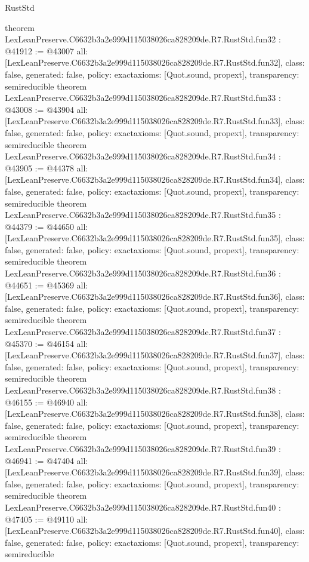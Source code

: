 \begin{lexlean}{RustStd}
\begin{coremodule}
{}
theorem LexLeanPreserve.C6632b3a2e999d115038026ca828209de.R7.RustStd.fun32 : @41912 := @43007 {
  all: [LexLeanPreserve.C6632b3a2e999d115038026ca828209de.R7.RustStd.fun32],
  class: false,
  generated: false,
  policy: exact{axioms: [Quot.sound, propext]},
  transparency: semireducible
}
theorem LexLeanPreserve.C6632b3a2e999d115038026ca828209de.R7.RustStd.fun33 : @43008 := @43904 {
  all: [LexLeanPreserve.C6632b3a2e999d115038026ca828209de.R7.RustStd.fun33],
  class: false,
  generated: false,
  policy: exact{axioms: [Quot.sound, propext]},
  transparency: semireducible
}
theorem LexLeanPreserve.C6632b3a2e999d115038026ca828209de.R7.RustStd.fun34 : @43905 := @44378 {
  all: [LexLeanPreserve.C6632b3a2e999d115038026ca828209de.R7.RustStd.fun34],
  class: false,
  generated: false,
  policy: exact{axioms: [Quot.sound, propext]},
  transparency: semireducible
}
theorem LexLeanPreserve.C6632b3a2e999d115038026ca828209de.R7.RustStd.fun35 : @44379 := @44650 {
  all: [LexLeanPreserve.C6632b3a2e999d115038026ca828209de.R7.RustStd.fun35],
  class: false,
  generated: false,
  policy: exact{axioms: [Quot.sound, propext]},
  transparency: semireducible
}
theorem LexLeanPreserve.C6632b3a2e999d115038026ca828209de.R7.RustStd.fun36 : @44651 := @45369 {
  all: [LexLeanPreserve.C6632b3a2e999d115038026ca828209de.R7.RustStd.fun36],
  class: false,
  generated: false,
  policy: exact{axioms: [Quot.sound, propext]},
  transparency: semireducible
}
theorem LexLeanPreserve.C6632b3a2e999d115038026ca828209de.R7.RustStd.fun37 : @45370 := @46154 {
  all: [LexLeanPreserve.C6632b3a2e999d115038026ca828209de.R7.RustStd.fun37],
  class: false,
  generated: false,
  policy: exact{axioms: [Quot.sound, propext]},
  transparency: semireducible
}
theorem LexLeanPreserve.C6632b3a2e999d115038026ca828209de.R7.RustStd.fun38 : @46155 := @46940 {
  all: [LexLeanPreserve.C6632b3a2e999d115038026ca828209de.R7.RustStd.fun38],
  class: false,
  generated: false,
  policy: exact{axioms: [Quot.sound, propext]},
  transparency: semireducible
}
theorem LexLeanPreserve.C6632b3a2e999d115038026ca828209de.R7.RustStd.fun39 : @46941 := @47404 {
  all: [LexLeanPreserve.C6632b3a2e999d115038026ca828209de.R7.RustStd.fun39],
  class: false,
  generated: false,
  policy: exact{axioms: [Quot.sound, propext]},
  transparency: semireducible
}
theorem LexLeanPreserve.C6632b3a2e999d115038026ca828209de.R7.RustStd.fun40 : @47405 := @49110 {
  all: [LexLeanPreserve.C6632b3a2e999d115038026ca828209de.R7.RustStd.fun40],
  class: false,
  generated: false,
  policy: exact{axioms: [Quot.sound, propext]},
  transparency: semireducible
}
\end{coremodule}
\end{lexlean}
